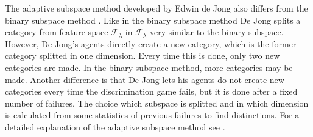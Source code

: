 The adaptive subspace method developed by Edwin de Jong also differs from the binary subspace method \citep{dejongvogt:1998,dejong:2000}. Like in the binary subspace method De Jong splits a category from feature space ${\mathcal F}_\lambda$ in ${\mathcal F}_{\lambda}$ very similar to the binary subspace. However, De Jong's agents directly create a new category, which is the former category splitted in one dimension. Every time this is done, only two new categories are made. In the binary subspace method, more categories may be made. Another difference is that De Jong lets his agents do not create new categories every time the discrimination game fails, but it is done after a fixed number of failures. The choice which subspace is splitted and in which dimension is calculated from some statistics of previous failures to find distinctions. For a detailed explanation of the adaptive subspace method see \citep{dejongvogt:1998,dejong:2000}.

